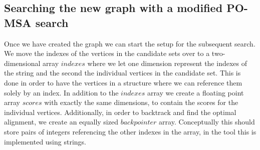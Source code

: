 \documentclass[thesis.tex]{subfiles}
\begin{document}
\subsection{Searching the new graph with a modified PO-MSA search}
Once we have created the graph we can start the setup for the subsequent search. We move the indexes of the vertices in the candidate sets over to a two-dimensional array $indexes$ where we let one dimension represent the indexes of the string and the second the individual vertices in the candidate set. This is done in order to have the vertices in a structure where we can reference them solely by an index. In addition to the $indexes$ array we create a floating point array $scores$ with exactly the same dimensions, to contain the scores for the individual vertices. Additionally, in order to backtrack and find the optimal alignment, we create an equally sized $backpointer$ array. Conceptually this should store pairs of integers referencing the other indexes in the array, in the tool this is implemented using strings.
\par\noindent
\end{document}

